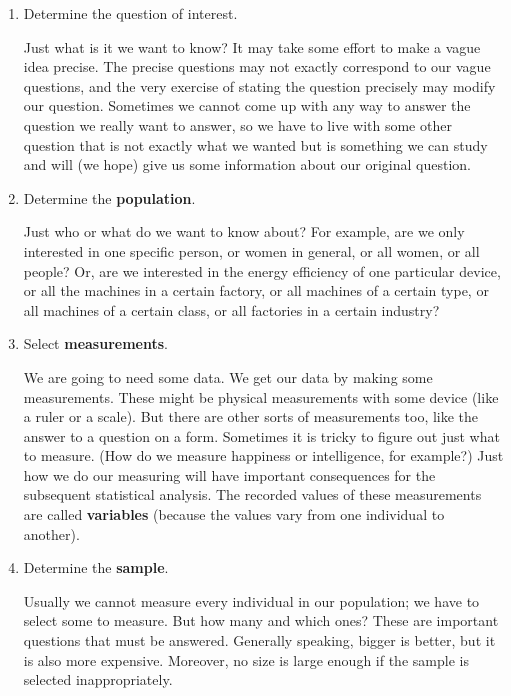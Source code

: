 \documentclass[twoside]{book}\usepackage[]{graphicx}\usepackage[]{xcolor}
\def\myindex#1{\index{#1}}
\def\term#1{\textbf{#1}}
\newcounter{example}[section]
\begin{document}
\begin{enumerate}
  \item Determine the question of interest.

	Just what is it we want to know?  It may take some effort to 
	make a vague idea precise.  The precise questions may not exactly
	correspond to our vague questions, and the very exercise of 
	stating the question precisely may modify our question.  Sometimes
	we cannot come up with any way to answer the question we really want
	to answer, so we have to live with some other question that is 
	not exactly what we wanted but is something we can study and will
	(we hope) give us some information about our original question.


  \item 
	Determine the \term{population}. 
	\myindex{population}%

	Just who or what do we want to know about?  For example, are we only interested in
	one specific person, or women in general, or all women, or all people?  Or, are we interested in the energy efficiency of one particular device, or all the machines in a certain factory, or all machines of a certain type, or all machines of a certain class, or all factories in a certain industry?

  \item
	Select \term{measurements}.

	We are going to need some data.  
	We get our data by making some measurements.
	These might be physical measurements with some device (like a ruler
	or a scale).
	But there are other sorts of measurements too, 
	like the answer to a question on a form.
	Sometimes it is tricky to figure out just what to measure.
	(How do we measure happiness or intelligence, for example?)
	Just how we do our measuring will have important consequences 
	for the subsequent statistical analysis.
	The recorded values of these measurements are called
	\term{variables} (because the values vary from one individual to another).

	  \item
	Determine the \term{sample}.
	\myindex{sample}%

	Usually we cannot measure every individual in our population; we have 
	to select some to measure.  
	But how many and which ones?  
	These are important questions that must be answered.
	Generally speaking, bigger is better, but it is also more expensive.
	Moreover, no size is large enough if the sample is selected inappropriately.


\end{enumerate}
\end{document}

